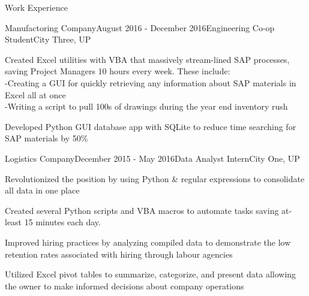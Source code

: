 \documentclass{resume} %
\begin{document}
\begin{rSection}{Work Experience}
\begin{rSubsection}{Manufactoring Company}{August 2016 - December 2016}{Engineering Co-op Student}{City Three, UP}
\item Created Excel utilities with VBA that massively stream-lined SAP processes, saving Project Managers 10 hours every week. These include: \\
-Creating a GUI for quickly retrieving any information about SAP materials in Excel all at once\\
-Writing a script to pull 100s of drawings during the year end inventory rush
\item Developed Python GUI database app with SQLite to reduce time searching for SAP materials by 50\%
\end{rSubsection}
\begin{rSubsection}{Logistics Company}{December 2015 - May 2016}{Data Analyst Intern}{City One, UP}
\item Revolutionized the position by using Python \& regular expressions to consolidate all data in one place
\item Created several Python scripts and VBA macros to automate tasks saving at-least 15 minutes each day.
\item Improved hiring practices by analyzing compiled data to demonstrate the low retention rates associated with hiring through labour agencies
\item Utilized Excel pivot tables to summarize, categorize, and present data allowing the owner to make informed decisions about company operations
\end{rSubsection}
\end{rSection}
\end{document}
